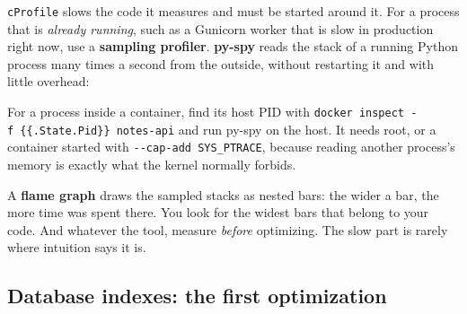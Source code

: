 \texttt{cProfile} slows the code it measures and must be started around it. For a process that is \emph{already running}, such as a Gunicorn worker that is slow in production right now, use a \textbf{sampling profiler}. \textbf{py-spy} reads the stack of a running Python process many times a second from the outside, without restarting it and with little overhead:

\begin{codebox}[short]

\begin{Shaded}
\begin{Highlighting}[]

 \OperatorTok{\textless{}}\OperatorTok{\textgreater{}}

 \OperatorTok{\textless{}}\OperatorTok{\textgreater{}}
\end{Highlighting}
\end{Shaded}

\end{codebox}

\noindent{}For a process inside a container, find its host PID with \texttt{docker\ inspect\ -}\allowbreak{}\texttt{f\ \textquotesingle{}\{\{.}\allowbreak{}\texttt{State.}\allowbreak{}\texttt{Pid\}\}\textquotesingle{}\ notes-}\allowbreak{}\texttt{api} and run py-spy on the host. It needs root, or a container started with \texttt{-\/-cap-add\ SYS\_PTRACE}, because reading another process's memory is exactly what the kernel normally forbids.

A \textbf{flame graph} draws the sampled stacks as nested bars: the wider a bar, the more time was spent there. You look for the widest bars that belong to your code. And whatever the tool, measure \emph{before} optimizing. The slow part is rarely where intuition says it is.

\subsection*{Database indexes: the first optimization}\label{36-scaling-load:database-indexes-the-first-optimization}

